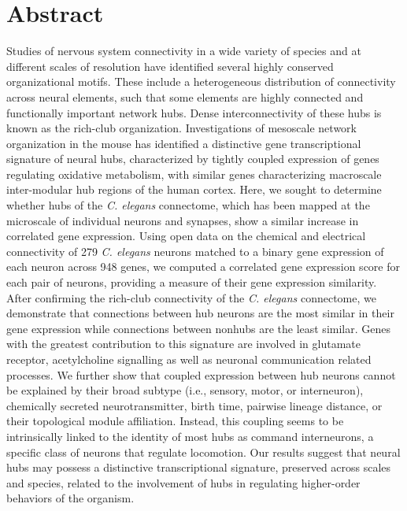 \documentclass[10pt,letterpaper]{article}
\begin{document}
\section*{Abstract}
Studies of nervous system connectivity in a wide variety of species and at different scales of resolution have identified several highly conserved organizational motifs.
These include a heterogeneous distribution of connectivity across neural elements, such that some elements are highly connected and functionally important network hubs.
Dense interconnectivity of these hubs is known as the rich-club organization.
Investigations of mesoscale network organization in the mouse has identified a distinctive gene transcriptional signature of neural hubs, characterized by tightly coupled expression of genes regulating oxidative metabolism, with similar genes characterizing macroscale inter-modular hub regions of the human cortex.
Here, we sought to determine whether hubs of the \emph{C. elegans} connectome, which has been mapped at the microscale of individual neurons and synapses, show a similar increase in correlated gene expression.
Using open data on the chemical and electrical connectivity of 279 \emph{C. elegans} neurons matched to a binary gene expression of each neuron across 948 genes, we computed a correlated gene expression score for each pair of neurons, providing a measure of their gene expression similarity.
After confirming the rich-club connectivity of the \emph{C. elegans} connectome, we demonstrate that connections between hub neurons are the most similar in their gene expression while connections between nonhubs are the least similar.
Genes with the greatest contribution to this signature are involved in glutamate receptor, acetylcholine signalling as well as neuronal communication related processes.
We further show that coupled expression between hub neurons cannot be explained by their broad subtype (i.e., sensory, motor, or interneuron), chemically secreted neurotransmitter, birth time, pairwise lineage distance, or their topological module affiliation.
Instead, this coupling seems to be intrinsically linked to the identity of most hubs as command interneurons, a specific class of neurons that regulate locomotion.
Our results suggest that neural hubs may possess a distinctive transcriptional signature, preserved across scales and species, related to the involvement of hubs in regulating higher-order behaviors of the organism.
\end{document}
